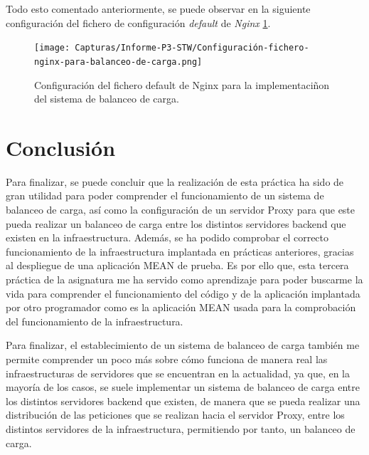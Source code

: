 \documentclass{report}
\begin{document}
  Todo esto comentado anteriormente, se puede observar en la siguiente configuración del fichero de configuración \emph{default} de \emph{Nginx} \ref{fig:Configuración-Nginx}.

  \begin{figure}[H]
    \centering
    \texttt{[image: Capturas/Informe-P3-STW/Configuración-fichero-nginx-para-balanceo-de-carga.png]}
    \caption{Configuración del fichero default de Nginx para la implementaciñon del sistema de balanceo de carga.}
    \label{fig:Configuración-Nginx}
  \end{figure}

  \chapter{Conclusión}
  Para finalizar, se puede concluir que la realización de esta práctica ha sido de gran utilidad para poder comprender el funcionamiento de un sistema de balanceo de carga, así como la configuración de un servidor Proxy para que este pueda realizar un balanceo de carga entre los distintos servidores backend que existen en la infraestructura. Además, se ha podido comprobar el correcto funcionamiento de la infraestructura implantada en prácticas anteriores, gracias al despliegue de una aplicación MEAN de prueba. Es por ello que, esta tercera práctica de la asignatura me ha servido como aprendizaje para poder buscarme la vida para comprender el funcionamiento del código y de la aplicación implantada por otro programador como es la aplicación MEAN usada para la comprobación del funcionamiento de la infraestructura. 

  Para finalizar, el establecimiento de un sistema de balanceo de carga también me permite comprender un poco más sobre cómo funciona de manera real las infraestructuras de servidores que se encuentran en la actualidad, ya que, en la mayoría de los casos, se suele implementar un sistema de balanceo de carga entre los distintos servidores backend que existen, de manera que se pueda realizar una distribución de las peticiones que se realizan hacia el servidor Proxy, entre los distintos servidores de la infraestructura, permitiendo por tanto, un balanceo de carga.
	
\end{document}
